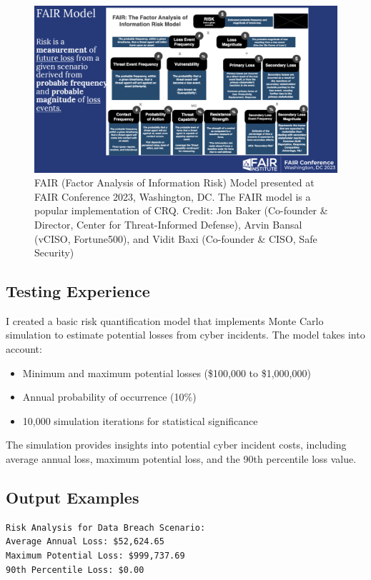 \begin{figure}[h]
    \centering
    \includegraphics[width=\textwidth]{images/fair_model.png}
    \caption{FAIR (Factor Analysis of Information Risk) Model presented at FAIR Conference 2023, Washington, DC. The FAIR model is a popular implementation of CRQ.
    Credit: Jon Baker (Co-founder \& Director, Center for Threat-Informed Defense), 
    Arvin Bansal (vCISO, Fortune500), and Vidit Baxi (Co-founder \& CISO, Safe Security)}
    \label{fig:fair-model}
\end{figure}

\subsection{Testing Experience}
I created a basic risk quantification model that implements Monte Carlo simulation 
to estimate potential losses from cyber incidents. The model takes into account:
\begin{itemize}
    \item Minimum and maximum potential losses (\$100,000 to \$1,000,000)
    \item Annual probability of occurrence (10\%)
    \item 10,000 simulation iterations for statistical significance
\end{itemize}

The simulation provides insights into potential cyber incident costs, including average 
annual loss, maximum potential loss, and the 90th percentile loss value.

\subsection{Output Examples}
\begin{verbatim}
Risk Analysis for Data Breach Scenario:
Average Annual Loss: $52,624.65
Maximum Potential Loss: $999,737.69
90th Percentile Loss: $0.00
\end{verbatim}

